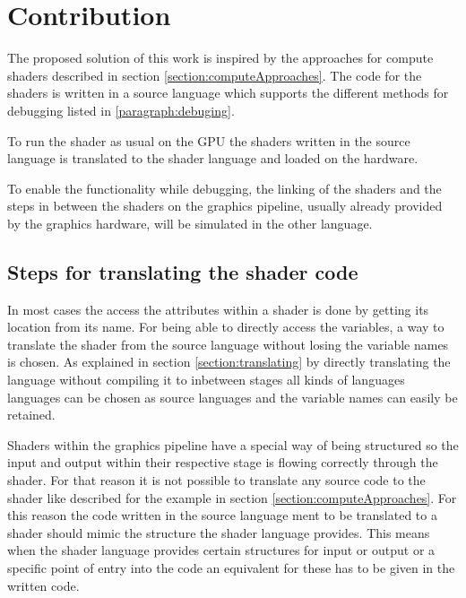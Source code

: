 

\chapter{Contribution}\label{cha:Contribution}

The proposed solution of this work is inspired by the approaches for compute shaders described in section \ref{section:computeApproaches}. The code for the shaders is written in a source language which supports the different methods for debugging listed in \ref{paragraph:debuging}.

To run the shader as usual on the GPU the shaders written in the source language is translated to the shader language and loaded on the hardware.

To enable the functionality while debugging, the linking of the shaders and the steps in between the shaders on the graphics pipeline, usually already provided by the graphics hardware, will be simulated in the other language.

\section{Steps for translating the shader code}
\label{section:contribution_translating}

In most cases the access the attributes within a shader is done by getting its location from its name. For being able to directly access the variables, a way to translate the shader from the source language without losing the variable names is chosen. As explained in section \ref{section:translating} by directly translating the language without compiling it to inbetween stages all kinds of languages languages can be chosen as source languages and the variable names can easily be retained.

Shaders within the graphics pipeline have a special way of being structured so the input and output within their respective stage is flowing correctly through the shader. For that reason it is not possible to translate any source code to the shader like described for the example in section \ref{section:computeApproaches}. For this reason the code written in the source language ment to be translated to a shader should mimic the structure the shader language provides. This means when the shader language provides certain structures for input or output or a specific point of entry into the code an equivalent for these has to be given in the written code.

